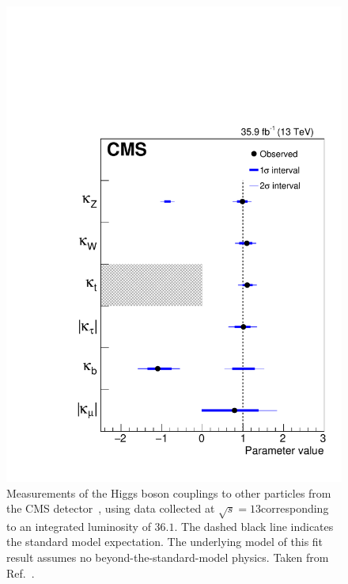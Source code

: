 \begin{figure}[hbtp]
  \begin{center}
    \includegraphics[width=\halflinewidth]{img/cmscombcouplings.pdf}
    \caption{%
        Measurements of the Higgs boson couplings to other particles from the CMS detector~\cite{Sirunyan:2018koj}, using data collected at $\sqrt{s}=13$\TeV corresponding to an integrated luminosity of $36.1$\fbinv.
        The dashed black line indicates the standard model expectation.
        The underlying model of this fit result assumes no beyond-the-standard-model physics.
        Taken from Ref.~\cite{Sirunyan:2018koj}.
        }
    \label{fig:productiondecay}
  \end{center}
\end{figure}


